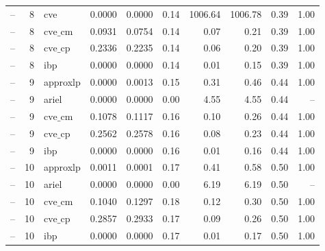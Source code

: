 \begin{table}[ht]
\begin{tabular}{lrlrrrrrrr}
-- & 8 & cve & 0.0000 & 0.0000 & 0.14 & 1006.64 & 1006.78 & 0.39 & 1.00 \\
-- & 8 & $\text{cve\_cm}$ & 0.0931 & 0.0754 & 0.14 & 0.07 & 0.21 & 0.39 & 1.00 \\
-- & 8 & $\text{cve\_cp}$ & 0.2336 & 0.2235 & 0.14 & 0.06 & 0.20 & 0.39 & 1.00 \\
-- & 8 & ibp & 0.0000 & 0.0000 & 0.14 & 0.01 & 0.15 & 0.39 & 1.00 \\
-- & 9 & approxlp & 0.0000 & 0.0013 & 0.15 & 0.31 & 0.46 & 0.44 & 1.00 \\
-- & 9 & ariel & 0.0000 & 0.0000 & 0.00 & 4.55 & 4.55 & 0.44 & -- \\
-- & 9 & $\text{cve\_cm}$ & 0.1078 & 0.1117 & 0.16 & 0.10 & 0.26 & 0.44 & 1.00 \\
-- & 9 & $\text{cve\_cp}$ & 0.2562 & 0.2578 & 0.16 & 0.08 & 0.23 & 0.44 & 1.00 \\
-- & 9 & ibp & 0.0000 & 0.0000 & 0.16 & 0.01 & 0.16 & 0.44 & 1.00 \\
-- & 10 & approxlp & 0.0011 & 0.0001 & 0.17 & 0.41 & 0.58 & 0.50 & 1.00 \\
-- & 10 & ariel & 0.0000 & 0.0000 & 0.00 & 6.19 & 6.19 & 0.50 & -- \\
-- & 10 & $\text{cve\_cm}$ & 0.1040 & 0.1297 & 0.18 & 0.12 & 0.30 & 0.50 & 1.00 \\
-- & 10 & $\text{cve\_cp}$ & 0.2857 & 0.2933 & 0.17 & 0.09 & 0.26 & 0.50 & 1.00 \\
-- & 10 & ibp & 0.0000 & 0.0000 & 0.17 & 0.01 & 0.17 & 0.50 & 1.00 \\
\bottomrule
\end{tabular}
\end{table}
